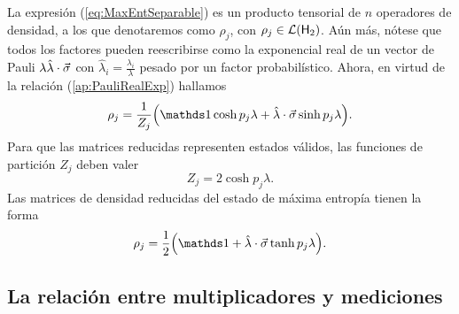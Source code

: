 La expresión (\ref{eq:MaxEntSeparable}) es un producto tensorial de $n$ operadores de densidad, a los que denotaremos como $\rho_{j}$, con $\rho_{j}\in\mathcal{L}({\sf H}_{2})$. Aún más, nótese que todos los factores pueden reescribirse como la exponencial real de un vector de Pauli $\lambda\hat{\lambda}\cdot\vec{\sigma}$ con $\hat{\lambda}_{i}=\frac{\lambda_{i}}{\lambda}$ pesado por un factor probabilístico. Ahora, en virtud de la relación (\ref{ap:PauliRealExp}) hallamos
\begin{equation*}
    \rho_{j}=\frac{1}{Z_{j}}\qty(\Id\cosh{p_{j}\lambda}+\paulivec{\lambda}\sinh{p_{j}\lambda}).
\end{equation*}
Para que las matrices reducidas representen estados válidos, las funciones de partición $Z_{j}$ deben valer
\begin{equation*}
    Z_{j}=2\cosh{p_{j}\lambda}.
\end{equation*}
Las matrices de densidad reducidas del estado de máxima entropía tienen la forma
\begin{equation}\label{eq:rhoArhoB}
    \rho_{j}=\frac{1}{2}\qty(\Id+\paulivec{\lambda}\tanh{p_{j}\lambda}).
\end{equation}

\subsection{La relación entre multiplicadores y mediciones}


